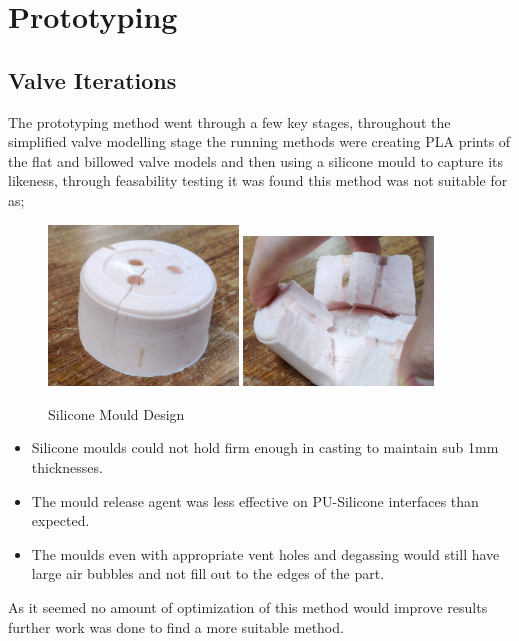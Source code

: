 



\section{Prototyping}
\subsection{Valve Iterations}
The prototyping method went through a few key stages, throughout the simplified valve modelling stage the running methods were creating \gls{PLA} prints of the flat and billowed valve models and then using a silicone mould to capture its likeness, through feasability testing it was found this method was not suitable for as;
\begin{figure}
    \centering
    \includegraphics[width=0.45\textwidth]{figures/silicone mould}
    \includegraphics[width=0.45\textwidth]{figures/silicone mould open}
    \caption{Silicone Mould Design}
    \label{fig:silimould}
\end{figure}
\begin{itemize}
    \item Silicone moulds could not hold firm enough in casting to maintain sub 1mm thicknesses.
    \item The mould release agent was less effective on \gls{PU}-Silicone interfaces than expected.
    \item The moulds even with appropriate vent holes and degassing would still have large air bubbles and not fill out to the edges of the part.
\end{itemize}
As it seemed no amount of optimization of this method would improve results further work was done to find a more suitable method.

